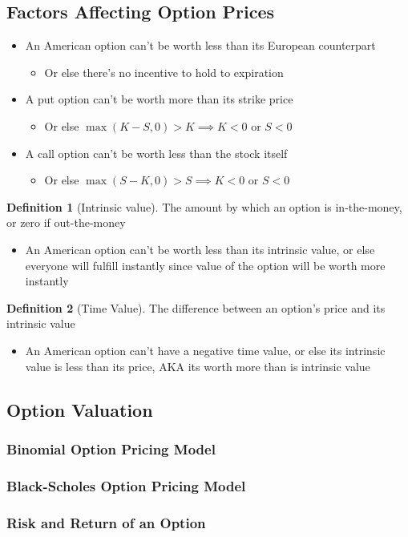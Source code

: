 \documentclass[11pt]{article}
\theoremstyle{definition}
\newtheorem*{definition}{Definition}
\begin{document}
\subsection{Factors Affecting Option Prices}
\begin{itemize}
    \item An American option can't be worth less than its European counterpart
    \begin{itemize}
        \item Or else there's no incentive to hold to expiration
    \end{itemize}
    \item A put option can't be worth more than its strike price
    \begin{itemize}
        \item Or else $\max(K-S, 0) > K \implies K < 0$ or $S < 0$
    \end{itemize}
    \item A call option can't be worth less than the stock itself
    \begin{itemize}
        \item Or else $\max(S-K, 0) > S \implies K < 0$ or $S < 0$
    \end{itemize}
\end{itemize}
\begin{definition}[Intrinsic value]
    The amount by which an option is in-the-money, or zero if out-the-money
\end{definition}
\begin{itemize}
    \item An American option can't be worth less than its intrinsic value, or else everyone will fulfill instantly since value of the option will be worth more instantly 
\end{itemize}
\begin{definition}[Time Value]
    The difference between an option's price and its intrinsic value
\end{definition}
\begin{itemize}
    \item An American option can't have a negative time value, or else its intrinsic value is less than its price, AKA its worth more than is intrinsic value
\end{itemize}


\subsection{Option Valuation}
\subsubsection{Binomial Option Pricing Model}


\subsubsection{Black-Scholes Option Pricing Model}


\subsubsection{Risk and Return of an Option}
\end{document}
